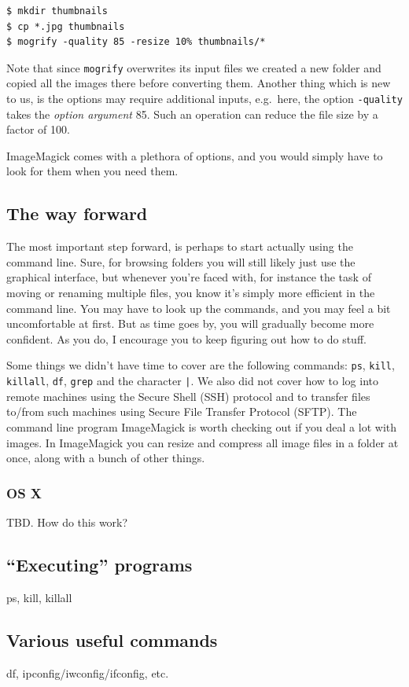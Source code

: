 \begin{verbatim}
$ mkdir thumbnails
$ cp *.jpg thumbnails
$ mogrify -quality 85 -resize 10% thumbnails/*
\end{verbatim}
Note that since \verb|mogrify| overwrites its input files we created a new folder and copied all the images there before converting them. Another thing which is new to us, is the options may require additional inputs, e.g.\ here, the option \verb|-quality| takes the \emph{option argument} 85. Such an operation can reduce the file size by a factor of 100.

ImageMagick comes with a plethora of options, and you would simply have to look for them when you need them.

\subsection{The way forward}
The most important step forward, is perhaps to start actually using the command line. Sure, for browsing folders you will still likely just use the graphical interface, but whenever you're faced with, for instance the task of moving or renaming multiple files, you know it's simply more efficient in the command line. You may have to look up the commands, and you may feel a bit uncomfortable at first. But as time goes by, you will gradually become more confident. As you do, I encourage you to keep figuring out how to do stuff.

Some things we didn't have time to cover are the following commands: \verb|ps|, \verb|kill|, \verb|killall|, \verb|df|, \verb|grep| and the character \verb$|$. We also did not cover how to log into remote machines using the Secure Shell (SSH) protocol and to transfer files to/from such machines using Secure File Transfer Protocol (SFTP). The command line program ImageMagick is worth checking out if you deal a lot with images. In ImageMagick you can resize and compress all image files in a folder at once, along with a bunch of other things.

\subsubsection{OS X}
TBD. How do this work?

\subsection{``Executing'' programs}
ps, kill, killall

\subsection{Various useful commands}
df, ipconfig/iwconfig/ifconfig, etc.

